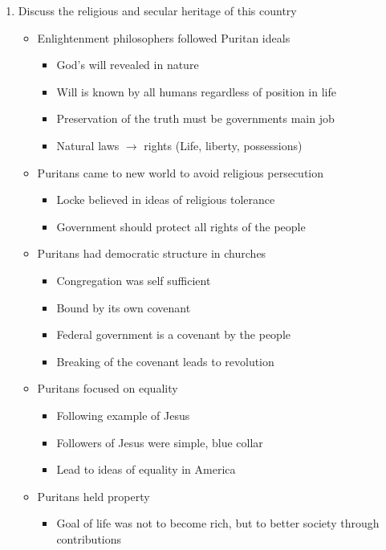 \documentclass[8pt]{article}
\begin{document}
\begin{enumerate}
    \item Discuss the religious and secular heritage of this country
    \begin{itemize}
        \item Enlightenment philosophers followed Puritan ideals
        \begin{itemize}
            \item God's will revealed in nature
            \item Will is known by all humans regardless of position in life
            \item Preservation of the truth must be governments main job
            \item Natural laws $\to$ rights (Life, liberty, possessions)
        \end{itemize}
        \item Puritans came to new world to avoid religious persecution
        \begin{itemize}
            \item Locke believed in ideas of religious tolerance
            \item Government should protect all rights of the people
        \end{itemize}
        \item Puritans had democratic structure in churches
        \begin{itemize}
            \item Congregation was self sufficient
            \item Bound by its own covenant
            \item Federal government is a covenant by the people
            \item Breaking of the covenant leads to revolution
        \end{itemize}
        \item Puritans focused on equality
        \begin{itemize}
            \item Following example of Jesus
            \item Followers of Jesus were simple, blue collar
            \item Lead to ideas of equality in America
        \end{itemize}
        \item Puritans held property
        \begin{itemize}
            \item Goal of life was not to become rich, but to better society through contributions

\end{itemize}
\end{itemize}
\end{enumerate}
\end{document}
